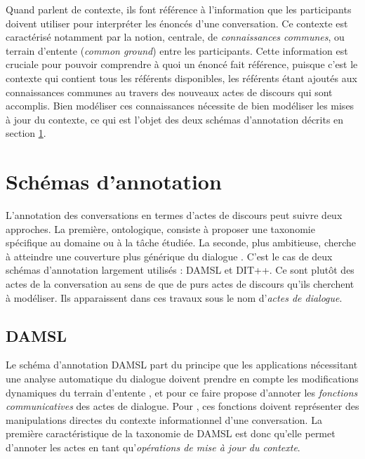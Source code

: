 \documentclass[10pt,a4paper,twoside]{article}
\begin{document}
Quand \citeauthor{poesio1997conversational} parlent de contexte, ils font référence à l'information que les participants doivent utiliser pour interpréter les énoncés d'une conversation. Ce contexte est caractérisé notamment par la notion, centrale, de \textit{connaissances communes}, ou \og terrain d'entente \fg{} (\textit{common ground}) entre les participants. Cette information est cruciale pour pouvoir comprendre à quoi un énoncé fait référence, puisque c'est le contexte qui contient tous les référents disponibles, les référents étant ajoutés aux connaissances communes au travers des nouveaux actes de discours qui sont accomplis. Bien modéliser ces connaissances nécessite de bien modéliser les mises à jour du contexte, ce qui est l'objet des deux schémas d'annotation décrits en section \ref{sec:annotation_schemes}.

\section{Schémas d'annotation}
\label{sec:annotation_schemes}

L'annotation des conversations en termes d'actes de discours peut suivre deux approches. La première, ontologique, consiste à proposer une taxonomie spécifique au domaine ou à la tâche étudiée. La seconde, plus ambitieuse, cherche à atteindre une couverture plus générique du dialogue \cite{leech2003generic}. C'est le cas de deux schémas d'annotation largement utilisés : DAMSL et DIT++. Ce sont plutôt des actes de la conversation au sens de \citeauthor{traum1992conversation} que de purs actes de discours qu'ils cherchent à modéliser. Ils apparaissent dans ces travaux sous le nom d'\textit{actes de dialogue}.

\subsection{DAMSL}
\label{subsec:DAMSL}

Le schéma d'annotation DAMSL part du principe que les applications nécessitant une analyse automatique du dialogue doivent prendre en compte les modifications dynamiques du \og terrain d'entente \fg, et pour ce faire propose d'annoter les \textit{fonctions communicatives} des actes de dialogue. Pour \citet{core1997coding}, ces fonctions doivent représenter des manipulations directes du contexte informationnel d'une conversation. La première caractéristique de la taxonomie de DAMSL est donc qu'elle permet d'annoter les actes en tant qu'\textit{opérations de mise à jour du contexte}.
\end{document}
